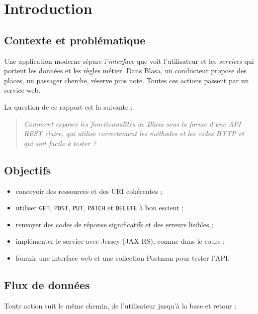 \documentclass[11pt,a4paper]{article}
\begin{document}
\tableofcontents
\newpage

\section{Introduction}

\subsection{Contexte et probl\'ematique}
Une application moderne s\'epare l'\emph{interface} que voit l'utilisateur et les \emph{services} qui portent les donn\'ees et les r\`egles m\'etier. Dans Blasa, un conducteur propose des places, un passager cherche, r\'eserve puis note. Toutes ces actions passent par un service web.

La question de ce rapport est la suivante :
\begin{quote}
\emph{Comment exposer les fonctionnalit\'es de Blasa sous la forme d'une API REST claire, qui utilise correctement les m\'ethodes et les codes HTTP et qui soit facile \`a tester ?}
\end{quote}

\subsection{Objectifs}
\begin{itemize}
  \item concevoir des ressources et des URI coh\'erentes ;
  \item utiliser \texttt{GET}, \texttt{POST}, \texttt{PUT}, \texttt{PATCH} et \texttt{DELETE} \`a bon escient ;
  \item renvoyer des codes de r\'eponse significatifs et des erreurs lisibles ;
  \item impl\'ementer le service avec Jersey (JAX-RS), comme dans le cours ;
  \item fournir une interface web et une collection Postman pour tester l'API.
\end{itemize}

\subsection{Flux de donn\'ees}
Toute action suit le m\^eme chemin, de l'utilisateur jusqu'\`a la base et retour :
\end{document}
